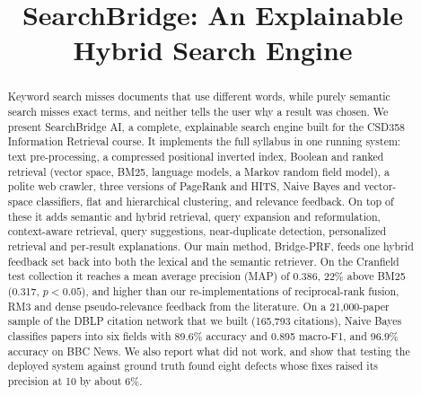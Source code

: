 \documentclass[conference]{IEEEtran}
\begin{document}
\title{SearchBridge: An Explainable Hybrid Search Engine}

\author{
\and
{}
\and
{}
}

\maketitle

\begin{abstract}
Keyword search misses documents that use different words, while purely semantic search misses exact terms, and neither tells the user why a result was chosen. We present SearchBridge AI, a complete, explainable search engine built for the CSD358 Information Retrieval course. It implements the full syllabus in one running system: text pre-processing, a compressed positional inverted index, Boolean and ranked retrieval (vector space, BM25, language models, a Markov random field model), a polite web crawler, three versions of PageRank and HITS, Naive Bayes and vector-space classifiers, flat and hierarchical clustering, and relevance feedback. On top of these it adds semantic and hybrid retrieval, query expansion and reformulation, context-aware retrieval, query suggestions, near-duplicate detection, personalized retrieval and per-result explanations. Our main method, Bridge-PRF, feeds one hybrid feedback set back into both the lexical and the semantic retriever. On the Cranfield test collection it reaches a mean average precision (MAP) of 0.386, 22\% above BM25 (0.317, $p<0.05$), and higher than our re-implementations of reciprocal-rank fusion, RM3 and dense pseudo-relevance feedback from the literature. On a 21,000-paper sample of the DBLP citation network that we built (165,793 citations), Naive Bayes classifies papers into six fields with 89.6\% accuracy and 0.895 macro-F1, and 96.9\% accuracy on BBC News. We also report what did not work, and show that testing the deployed system against ground truth found eight defects whose fixes raised its precision at 10 by about 6\%.
\end{abstract}
\end{document}
